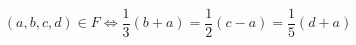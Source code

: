 \begin{displaymath}
(a,b,c,d)\in F \Leftrightarrow \frac{1}{3}(b+a)=\frac{1}{2}(c-a)=\frac{1}{5}(d+a)
\end{displaymath}
